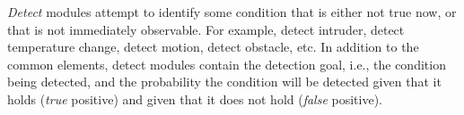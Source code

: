 \documentclass[ 5p, 12pt, times, twocolumn, sort&compress ]{elsarticle}
\begin{document}
%
%
%
%


{\em Detect\/} modules attempt to identify some condition that is either not true now, or that is not immediately observable.
For example, detect intruder, detect temperature change, detect motion, detect obstacle, etc.
In addition to the common elements,
detect modules contain the detection goal, i.e., the condition being detected, and the probability the condition will be detected given
that it holds ({\em true} positive) and given that it does not hold ({\em false\/} positive).
\end{document}
